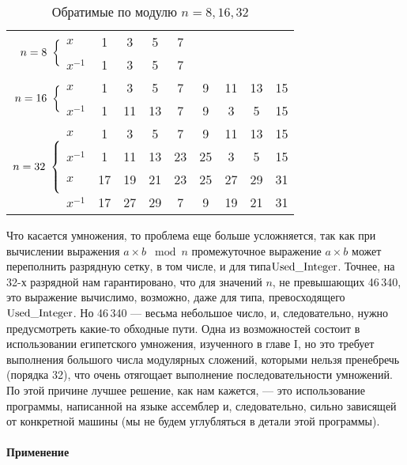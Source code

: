     \renewcommand{\baselinestretch}{1.25}
    \begin{table}[h!]
    \centering
    \begin{tabular}{|rl|cccccccc|}
    \hline
    \multirow{2}{*}{$n = 8\ \left\{\vrule height 3.175ex depth 0pt width 0pt\right.\!\!\!\!\!$} & $x$ & 1 & 3 & 5 & 7 & \multicolumn{1}{l}{} & \multicolumn{1}{l}{} & \multicolumn{1}{l}{} & \multicolumn{1}{l|}{} \\ \cline{2-10}
    & $x^{-1}$ & 1 & 3 & 5 & 7 & \multicolumn{1}{l}{} & \multicolumn{1}{l}{} & \multicolumn{1}{l}{} & \multicolumn{1}{l|}{} \\ \hline
    \multirow{2}{*}{$n = 16\ \left\{\vrule height 3.1755ex depth 0pt width 0pt\right.\!\!\!\!\!$} & $x$ & 1 & 3 & 5 & 7 & 9 & 11 & 13 & 15 \\ \cline{2-10}
    & $x^{-1}$ & 1 & 11 & 13 & 7 & 9 & 3 & 5 & 15 \\ \hline
    \multirow{4}{*}{$n = 32\ \left\{\vrule height 6.175ex depth 0pt width 0pt\right.\!\!\!\!\!$} & $x$ & 1 & 3 & 5 & 7 & 9 & 11 & 13 & 15 \\ \cline{2-10}
    & $x^{-1}$ & 1 & 11 & 13 & 23 & 25 & 3 & 5 & 15 \\ \cline{2-10}
    & $x$ & 17 & 19 & 21 & 23 & 25 & 27 & 29 & 31 \\ \cline{2-10}
    & $x^{-1}$ & 17 & 27 & 29 & 7 & 9 & 19 & 21 & 31 \\ \hline
    \end{tabular}
    \caption{Обратимые по модулю $n = 8, 16, 32$}
    \label{my-label}
    \end{table}

    Что касается умножения, то проблема еще больше усложняется, так как при вычислении выражения $ a\times b\; \bmod n$ промежуточное выражение $ a\times b$ может переполнить разрядную сетку, в том числе, и для типа\linebreak $\lstinline{Used_Integer}$. Точнее, на 32-х разрядной нам гарантировано, что для значений $n$, не превышающих 46\,340, это выражение вычислимо, возможно, даже для типа, превосходящего $\lstinline{Used_Integer}$. Но 46\,340 — весьма небольшое число, и, следовательно, нужно предусмотреть какие-то обходные пути. Одна из возможностей состоит в использовании египетского умножения, изученного в главе I, но это требует выполнения большого числа модулярных сложений, которыми нельзя пренебречь (порядка 32), что очень отягощает выполнение последовательности умножений. По этой причине лучшее решение, как нам кажется, — это использование программы, написанной на языке ассемблер и, следовательно, сильно зависящей от конкретной машины (мы не будем углубляться в детали этой программы).\\\\
    {\textbf{Применение}}

